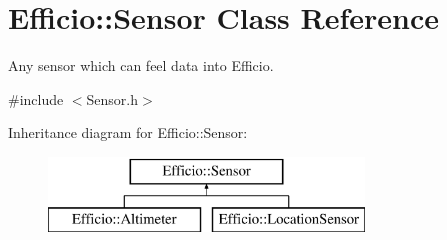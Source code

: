 \hypertarget{class_efficio_1_1_sensor}{}\section{Efficio\+:\+:Sensor Class Reference}
\label{class_efficio_1_1_sensor}


Any sensor which can feel data into Efficio.  




{\ttfamily \#include $<$Sensor.\+h$>$}

Inheritance diagram for Efficio\+:\+:Sensor\+:\begin{figure}[H]
\begin{center}
\leavevmode
\includegraphics[height=2.000000cm]{class_efficio_1_1_sensor}
\end{center}
\end{figure}
